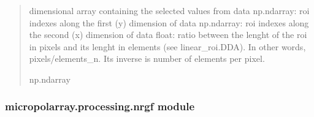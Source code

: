 \documentclass[letterpaper,10pt,english]{sphinxmanual}
\begin{document}
\begin{fulllineitems}
\begin{quote}
\begin{description}
\sphinxhyphen{}dimensional array containing the selected values
from data
np.ndarray: roi indexes along the first (y) dimension of data
np.ndarray: roi indexes along the second (x) dimension of data
float: ratio between the lenght of the roi in pixels and its lenght in elements (see linear\_roi.DDA). In other words, pixels/elements\_n. Its inverse is number of elements per pixel.

\sphinxAtStartPar
np.ndarray

\end{description}\end{quote}

\end{fulllineitems}



\subsubsection{micropolarray.processing.nrgf module}
\label{\detokenize{micropolarray.processing:module-micropolarray.processing.nrgf}}\label{\detokenize{micropolarray.processing:micropolarray-processing-nrgf-module}}
\end{document}
